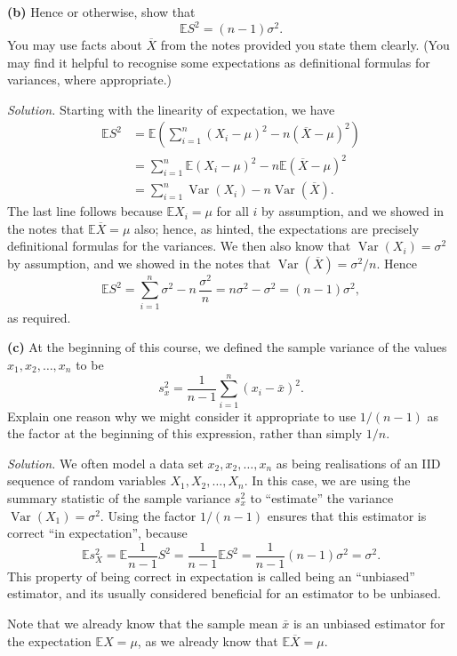 \documentclass[
  a4paper,
]{book}
\theoremstyle{definition}
\theoremstyle{definition}
\theoremstyle{definition}
\theoremstyle{definition}
\theoremstyle{remark}
\begin{document}
\textbf{(b)} Hence or otherwise, show that
\[ \mathbb E S^2 = (n - 1)\sigma^2 . \]
You may use facts about \(\overline X\) from the notes provided you state them clearly. (You may find it helpful to recognise some expectations as definitional formulas for variances, where appropriate.)

\begin{myanswers}
\emph{Solution.} Starting with the linearity of expectation, we have
\begin{align*}
\mathbb ES^2 &= \mathbb E \left( \sum_{i=1}^n (X_i - \mu)^2 - n(\overline X - \mu)^2  \right) \\
  &= \sum_{i=1}^n \mathbb E (X_i - \mu)^2 - n \mathbb E(\overline X - \mu)^2 \\
  &= \sum_{i=1}^n \operatorname{Var}(X_i) - n \operatorname{Var}(\overline X) .
\end{align*}
The last line follows because \(\mathbb EX_i = \mu\) for all \(i\) by assumption, and we showed in the notes that \(\mathbb E \overline X = \mu\) also; hence, as hinted, the expectations are precisely definitional formulas for the variances. We then also know that \(\operatorname{Var}(X_i) = \sigma^2\) by assumption, and we showed in the notes that \(\operatorname{Var}(\overline X) = \sigma^2/n\). Hence
\[ \mathbb ES^2 = \sum_{i=1}^n \sigma^2 - n\, \frac{\sigma^2}{n} = n \sigma^2 - \sigma^2 = (n-1)\sigma^2, \]
as required.

\end{myanswers}

\textbf{(c)} At the beginning of this course, we defined the sample variance of the values \(x_1, x_2, \dots, x_n\) to be
\[ s^2_x = \frac{1}{n-1} \sum_{i=1}^n (x_i - \bar x)^2 . \]
Explain one reason why we might consider it appropriate to use \(1/(n-1)\) as the factor at the beginning of this expression, rather than simply \(1/n\).

\begin{myanswers}
\emph{Solution.}
We often model a data set \(x_2, x_2, \dots, x_n\) as being realisations of an IID sequence of random variables \(X_1, X_2, \dots, X_n\). In this case, we are using the summary statistic of the sample variance \(s_x^2\) to ``estimate'' the variance \(\operatorname{Var}(X_1) = \sigma^2\). Using the factor \(1/(n-1)\) ensures that this estimator is correct ``in expectation'', because
\[ \mathbb E s_X^2 = \mathbb E \frac{1}{n-1}S^2 = \frac{1}{n-1} \mathbb ES^2 = \frac{1}{n-1}(n-1)\sigma^2 = \sigma^2 . \]
This property of being correct in expectation is called being an ``unbiased'' estimator, and its usually considered beneficial for an estimator to be unbiased.

Note that we already know that the sample mean \(\bar x\) is an unbiased estimator for the expectation \(\mathbb EX = \mu\), as we already know that \(\mathbb E\overline X = \mu\).

\end{myanswers}
\end{document}
